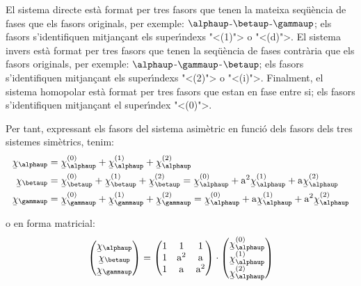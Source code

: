  
 El sistema directe est\`{a} format per tres
fasors que tenen la mateixa seq\"{u}\`{e}ncia de fases que els fasors
originals, per exemple: $\alphaup$-$\betaup$-$\gammaup$; els fasors
s'identifiquen mitjan\c{c}ant els super\'{\i}ndexs {"<}(1){">} o {"<}(d){">}. El sistema
invers est\`{a} format per tres fasors que tenen la seq\"{u}\`{e}ncia de fases contr\`{a}ria
 que els fasors originals, per exemple:
$\alphaup$-$\gammaup$-$\betaup$; els fasors s'identifiquen mitjan\c{c}ant els
super\'{\i}ndexs {"<}(2){">} o {"<}(i){">}. Finalment, el sistema homopolar est\`{a}
format per tres fasors que estan en fase entre si; els fasors
s'identifiquen mitjan\c{c}ant el super\'{\i}ndex {"<}(0){">}.

Per tant, expressant els fasors del sistema asim\`{e}tric en funci\'{o}
dels fasors dels tres sistemes sim\`{e}trics, tenim:
\begin{subequations}
\begin{align}
   \cmplx{\chi}_\alphaup &= \cmplx{\chi}_\alphaup\ap{(0)}  +
   \cmplx{\chi}_\alphaup\ap{(1)} + \cmplx{\chi}_\alphaup\ap{(2)} \label{eq:c_sim_a}\\
   \cmplx{\chi}_\betaup &= \cmplx{\chi}_\betaup\ap{(0)} + \cmplx{\chi}_\betaup\ap{(1)} +
   \cmplx{\chi}_\betaup\ap{(2)}  =  \cmplx{\chi}_\alphaup\ap{(0)} + \au^2
   \cmplx{\chi}_\alphaup\ap{(1)} + \au \cmplx{\chi}_\alphaup\ap{(2)} \label{eq:c_sim_b}\\
   \cmplx{\chi}_\gammaup &= \cmplx{\chi}_\gammaup\ap{(0)} + \cmplx{\chi}_\gammaup\ap{(1)} +
   \cmplx{\chi}_\gammaup\ap{(2)}  = \cmplx{\chi}_\alphaup\ap{(0)} + \au
   \cmplx{\chi}_\alphaup\ap{(1)} + \au^2 \cmplx{\chi}_\alphaup\ap{(2)} \label{eq:c_sim_c}
\end{align}
\end{subequations}

o en forma matricial:
\begin{equation}
   \begin{pmatrix}
     \cmplx{\chi}_\alphaup \\
     \cmplx{\chi}_\betaup \\
     \cmplx{\chi}_\gammaup
   \end{pmatrix} =
   \begin{pmatrix}
     1 & 1 & 1 \\
     1 & \au^2 & \au\\
     1 & \au & \au^2
   \end{pmatrix} \cdot
   \begin{pmatrix}
     \cmplx{\chi}_\alphaup\ap{(0)} \\
     \cmplx{\chi}_\alphaup\ap{(1)} \\
     \cmplx{\chi}_\alphaup\ap{(2)}
   \end{pmatrix}
\end{equation}

